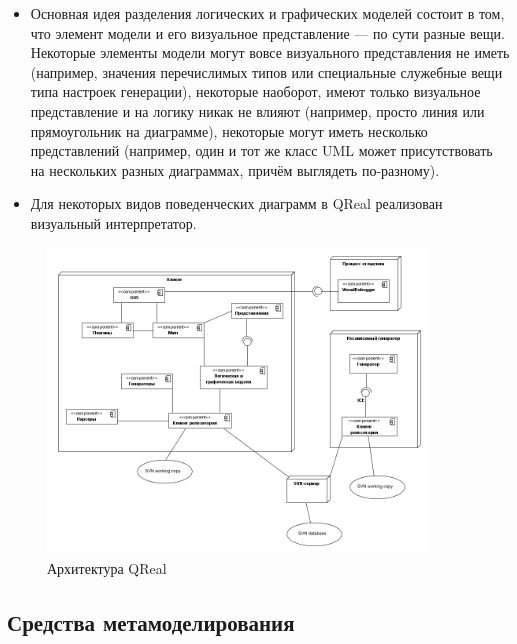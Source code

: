 \documentclass[a4paper]{article}
\begin{document}
\begin{itemize}
  \item Основная идея разделения логических и графических моделей состоит в том, что элемент модели и его визуальное представление --- по сути разные вещи. Некоторые элементы модели могут вовсе визуального представления не иметь (например, значения перечислимых типов или специальные служебные вещи типа настроек генерации), некоторые наоборот, имеют только визуальное представление и на логику никак не влияют (например, просто линия или прямоугольник на диаграмме), некоторые могут иметь несколько представлений (например, один и тот же класс UML может присутствовать на нескольких разных диаграммах, причём выглядеть по-разному). 
  \item Для некоторых видов поведенческих диаграмм в QReal реализован визуальный интерпретатор. 

\end{itemize}

\begin{figure} [ht]
  \begin{center}
    \includegraphics[width=0.9\textwidth]{01-architecture.png}
    \caption{Архитектура QReal}
    \label{qRealArchitecture}
  \end{center}
\end{figure}





\subsection{Средства метамоделирования}
\end{document}
